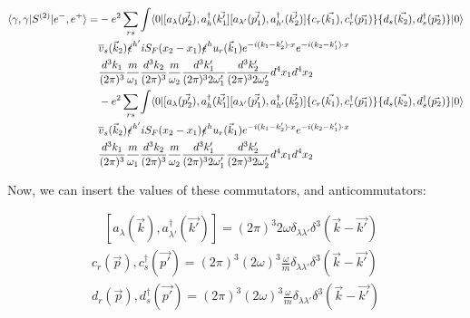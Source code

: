 \documentclass[a4]{article}
\begin{document}
\begin{framed}
            \begin{equation}
                \begin{aligned}
                    \langle \gamma, \gamma | S^{(2)} | e^{-}, e^{+} \rangle = & - e^{2} \sum_{r s} \int \langle 0 |[a_{\lambda} (\vec{p'_2}),a^{\dagger}_{h} (\vec{k'_1}] [a_{\lambda'} (\vec{p'_1}), a^{\dagger}_{h'} (\vec{k'_2})] \{c_{r} (\vec{k_1}), c^{\dagger}_{r} (\vec{p_1}) \} \{d_{s} (\vec{k_2}), d^{\dagger}_{s} (\vec{p_2}) \}| 0 \rangle \\
                    & \overline{v}_{s} (\vec{k}_2) \slashed{\epsilon}^{h'} i S_{F} (x_2 - x_1) \slashed{\epsilon}^{h} u_{r} (\vec{k}_1) e^{- i (k_1 - k'_2) \cdot x} e^{- i (k_2 - k'_1) \cdot x} \\
                    & \frac{d^3 k_1}{(2 \pi)^{3}} \frac{m}{\omega_1} \frac{d^3 k_2}{(2 \pi)^{3}} \frac{m}{\omega_2} \frac{d^3 k'_1}{(2 \pi)^{3} 2 \omega'_1} \frac{d^3 k'_2}{(2 \pi)^{3} 2 \omega'_2} d^4 x_1 d^4 x_2 \\
                    & - e^{2} \sum_{r s} \int \langle 0 |[a_{\lambda} (\vec{p'_2}),a^{\dagger}_{h} (\vec{k'_1}] [a_{\lambda'} (\vec{p'_1}), a^{\dagger}_{h'} (\vec{k'_2})] \{c_{r} (\vec{k_1}), c^{\dagger}_{r} (\vec{p_1}) \} \{d_{s} (\vec{k_2}), d^{\dagger}_{s} (\vec{p_2}) \}| 0 \rangle \\
                    & \overline{v}_{s} (\vec{k}_2) \slashed{\epsilon}^{h'} i S_{F} (x_2 - x_1) \slashed{\epsilon}^{h} u_{r} (\vec{k}_1) e^{- i (k_1 - k'_2) \cdot x} e^{- i (k_2 - k'_1) \cdot x} \\
                    & \frac{d^3 k_1}{(2 \pi)^{3}} \frac{m}{\omega_1} \frac{d^3 k_2}{(2 \pi)^{3}} \frac{m}{\omega_2} \frac{d^3 k'_1}{(2 \pi)^{3} 2 \omega'_1} \frac{d^3 k'_2}{(2 \pi)^{3} 2 \omega'_2} d^4 x_1 d^4 x_2
                \end{aligned}
            \end{equation}

            Now, we can insert the values of these commutators, and anticommutators:

            \begin{equation}
                \begin{aligned}
                    \quad [a_{\lambda} (\vec{k}), a^{\dag}_{\lambda'} (\vec{k'})] = (2 \pi)^{3} 2 \omega \delta_{\lambda \lambda'} \delta^{3} (\vec{k} - \vec{k'}) \\
                    {c_{r} (\vec{p}), c^{\dag}_{s} (\vec{p'})} = (2 \pi)^{3} (2 \omega)^{3} \frac{\omega}{m} \delta_{\lambda \lambda'} \delta^{3} (\vec{k} - \vec{k'}) \\
                    {d_{r} (\vec{p}), d^{\dag}_{s} (\vec{p'})} = (2 \pi)^{3} (2 \omega)^{3} \frac{\omega}{m} \delta_{\lambda \lambda'} \delta^{3} (\vec{k} - \vec{k'})
                \end{aligned}
            \end{equation}


\end{framed}
\end{document}
